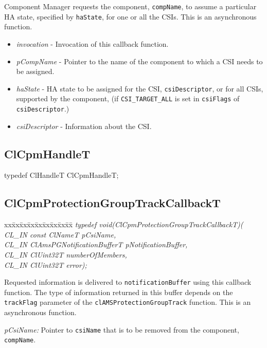 {Component Manager requests the component, {\tt{comp\-Name}}, to assume a particular HA state, specified by {\tt{ha\-State}}, for one or all the CSIs.
This is an asynchronous function.
\begin{itemize}
\item
\textit{invocation} - Invocation of this callback function.
\item
\textit{p\-Comp\-Name} - Pointer to the name of the component to which a CSI needs to be assigned.
\item
\textit{ha\-State} - HA state to be assigned for the CSI, {\tt{csi\-Descriptor}}, or for all CSIs, supported by the component, (if 
{\tt {CSI\_\-TARGET\_\-ALL}} is set in {\tt{csi\-Flags}} of {\tt{csi\-Descriptor}}.)
\item
\textit{csi\-Descriptor} - Information about the CSI. 
\end{itemize}


\subsection{ClCpmHandleT}

typedef ClHandleT ClCpmHandleT;


\subsection{ClCpmProtectionGroupTrackCallbackT}
\begin{tabbing}
xx\=xx\=xx\=xx\=xx\=xx\=xx\=xx\=xx\=\kill
\textit{typedef void(ClCpmProtectionGroupTrackCallbackT)(}\\
\>\>\>\>\textit{CL\_IN const ClNameT pCsiName,}\\
\>\>\>\>\textit{CL\_IN ClAmsPGNotificationBufferT pNotificationBuffer, }\\
\>\>\>\>\textit{CL\_IN ClUint32T numberOfMembers, }\\
\>\>\>\>\textit{CL\_IN ClUint32T error);}\\
\end{tabbing}
Requested information is delivered to {\tt{notification\-Buffer}} using this callback function. The type of information returned in this buffer depends
on the {\tt{track\-Flag}} parameter of the {\tt{cl\-AMSProtection\-Group\-Track}} function. This is an asynchronous function.

{\em p\-Csi\-Name:} Pointer to {\tt{csi\-Name}} that is to be removed from the component, {\tt{comp\-Name}}.

}
